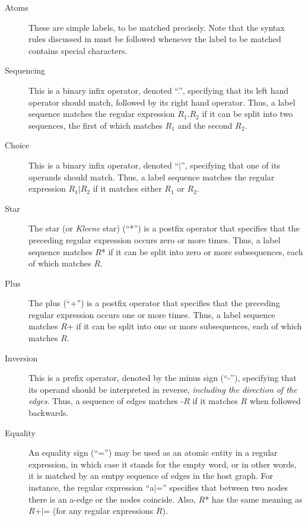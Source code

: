 \begin{description}
\item[Atoms] These are simple labels, to be matched precisely. Note that the
  syntax rules discussed in  must be followed whenever the label
  to be matched contains special characters.

\item[Sequencing] This is a binary infix operator, denoted ``\textsf{.}'',
  specifying that its left hand operator should match, followed by its right
  hand operator. Thus, a label sequence matches the regular expression
  \textsf{$R_1$.$R_2$} if it can be split into two sequences, the first of
  which matches $R_1$ and the second $R_2$.

\item[Choice] This is a binary infix operator, denoted ``\textsf{$|$}'',
  specifying that one of its operands should match. Thus, a label sequence
  matches the regular expression \textsf{$R_1|R_2$} if it matches either
  $R_1$ or $R_2$.

\item[Star] The star (or \emph{Kleene} star) (``\textsf{*}'') is a postfix
  operator that specifies that the preceding regular expression occurs zero or
  more times. Thus, a label sequence matches \textsf{$R$*} if it can be split
  into zero or more subsequences, each of which matches $R$.

\item[Plus] The plus (``\textsf{+}'') is a postfix operator that specifies that
  the preceding regular expression occurs one or more times. Thus, a label
  sequence matches \textsf{$R$+} if it can be split into one or more
  subsequences, each of which matches $R$.

\item[Inversion] This is a prefix operator, denoted by the minus sign
  (``\textsf{-}''), specifying that its operand should be interpreted in
  reverse, \emph{including the direction of the edges}. Thus, a sequence of
  edges matches \textsf{-$R$} if it matches $R$ when followed backwards.

\item[Equality] An equality sign (``\textsf{=}'') may be used as an atomic
  entity in a regular expression, in which case it stands for the empty word,
  or in other words, it is matched by an emtpy sequence of edges in the host
  graph. For instance, the regular expression ``\textsf{a$|$=}'' specifies that
  between two nodes there is an \textsf{a}-edge or the nodes coincide. Also,
  \textsf{$R$*} has the same meaning as \textsf{$R$+$|$=} (for any regular
  expressions $R$).


\end{description}
